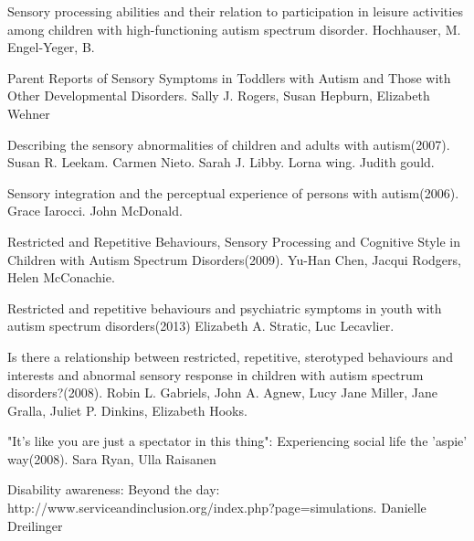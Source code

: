 \documentclass[11pt]{report}
\begin{document}
\begin{thebibliography}{9}
Sensory processing abilities and their relation to participation in leisure activities among children with high-functioning autism spectrum disorder. Hochhauser, M. Engel-Yeger, B.

Parent Reports of Sensory Symptoms in Toddlers with Autism and Those with Other Developmental Disorders. Sally J. Rogers, Susan Hepburn, Elizabeth Wehner

Describing the sensory abnormalities of children and adults with autism(2007). Susan R. Leekam. Carmen Nieto. Sarah J. Libby. Lorna wing. Judith gould. 

Sensory integration and the perceptual experience of persons with autism(2006). Grace Iarocci. John McDonald.

Restricted and Repetitive Behaviours, Sensory Processing and Cognitive Style in Children with Autism Spectrum Disorders(2009). Yu-Han Chen, Jacqui Rodgers, Helen McConachie.

Restricted and repetitive behaviours and psychiatric symptoms in youth with autism spectrum disorders(2013) Elizabeth A. Stratic, Luc Lecavlier.

Is there a relationship between restricted, repetitive, sterotyped behaviours and interests and abnormal sensory response in children with autism spectrum disorders?(2008). Robin L. Gabriels, John A. Agnew, Lucy Jane Miller, Jane Gralla, Juliet P. Dinkins, Elizabeth Hooks.

"It’s like you are just a spectator in this thing": Experiencing social life the 'aspie' way(2008). Sara Ryan, Ulla Raisanen

Disability awareness: Beyond the day: http://www.serviceandinclusion.org/index.php?page=simulations. Danielle Dreilinger

\end{thebibliography}
\end{document}
